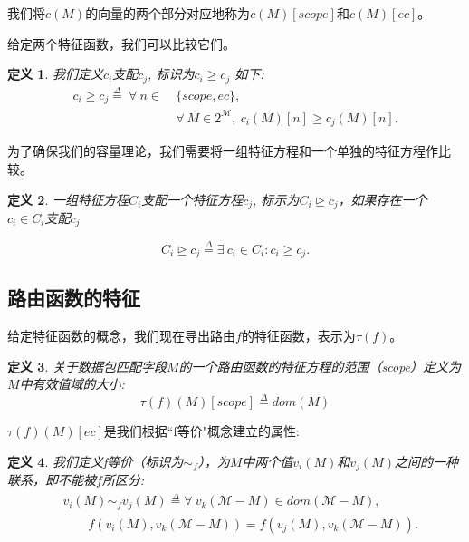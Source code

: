 \documentclass{ctexart}
\newtheorem{definition}{定义}
\begin{document}
我们将$c(M)$的向量的两个部分对应地称为$c(M)[scope]$和$c(M)[ec]$。

给定两个特征函数，我们可以比较它们。 

\begin{definition}我们定义$c_i$支配$c_j$, 标识为$c_i \geq c_j$ 如下:
\begin{equation*}
\begin{split}
c_i \geq c_j \overset{\Delta}{=}\ \forall\ n \in\ &\{scope, ec\},\\
&\forall\ M \in 2^\mathcal{M},\ c_i(M)[n] \geq c_j(M)[n].
\end{split}
\end{equation*}
\end{definition}

为了确保我们的容量理论，我们需要将一组特征方程和一个单独的特征方程作比较。


\begin{definition}
一组特征方程$C_i$支配一个特征方程$c_j$, 标示为$C_i \trianglerighteq c_j$，如果存在一个$c_i \in C_i$支配$c_j$

\begin{equation*}
C_i \trianglerighteq c_j \overset{\Delta}{=} \exists\ c_i \in C_i : c_i \geq c_j.
\end{equation*}
\end{definition}
 
\subsection{路由函数的特征} 
给定特征函数的概念，我们现在导出路由$f$的特征函数，表示为$\tau(f)$。

\begin{definition}
\label{def:set-comparator}
关于数据包匹配字段$M$的一个路由函数的特征方程的范围（scope）定义为$M$中有效值域的大小:
\begin{equation*}
\tau(f)(M)[scope] \overset{\Delta}{=} dom(M)
\end{equation*}
\end{definition}

$\tau(f)(M)[ec]$是我们根据``f等价"概念建立的属性: 
\begin{definition} 我们定义f等价（标识为$\sim_f$），为$M$中两个值$v_i(M)$和$v_j(M)$之间的一种联系，即不能被$f$所区分:
\begin{equation*}
\begin{split}
&v_i(M) \sim_f v_j(M) \overset{\Delta}{=} \forall\ v_k(\mathcal{M} - M) \in dom(\mathcal{M} - M),\\
&\qquad f(v_i(M), v_k(\mathcal{M} - M)) = f(v_j(M), v_k(\mathcal{M} - M)). 
\end{split}
\end{equation*}
\end{definition}
\end{document}
